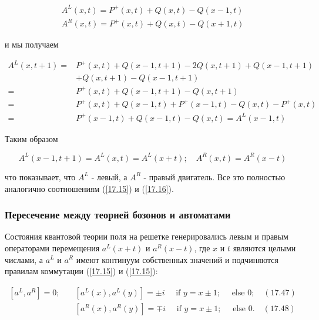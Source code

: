 \documentclass[main.tex]{subfiles}
\begin{document}
\begin{equation}\label{17.}
\begin{array}{l}
{A^{L}(x, t)=P^{+}(x, t)+Q(x, t)-Q(x-1, t)} \\
{A^{R}(x, t)=P^{+}(x, t)+Q(x, t)-Q(x+1, t)}
\end{array}
\end{equation}

и мы получаем

\begin{equation}\label{17.45}
	\begin{aligned} A^{L}(x, t+1)=& P^{+}(x, t)+Q(x-1, t+1)-2 Q(x, t+1)+Q(x-1, t+1) \\ &+Q(x, t+1)-Q(x-1, t+1) \\=& P^{+}(x, t)+Q(x-1, t+1)-Q(x, t+1) \\=& P^{+}(x, t)+Q(x-1, t)+P^{+}(x-1, t)-Q(x, t)-P^{+}(x, t) \\=& P^{+}(x-1, t)+Q(x-1, t)-Q(x, t)=A^{L}(x-1, t) \end{aligned}
\end{equation}

Таким образом

\begin{equation}\label{17.46}
A^{L}(x-1, t+1)=A^{L}(x, t)=A^{L}(x+t) ; \quad A^{R}(x, t)=A^{R}(x-t)
\end{equation}

что показывает, что $A^{L}$ - левый, а $A^{R}$ - правый двигатель. Все это полностью аналогично соотношениям (\ref{17.15}) и (\ref{17.16}).





\subsubsection{Пересечение между теорией бозонов и автоматами}\label{ch17.1.3}

Состояния квантовой теории поля на решетке генерировались левым и правым операторами перемещения $a^{L}(x+t)$ и $a^{R}(x-t)$, где $x$ и $t$ являются целыми числами, а $a^{L}$ и $a^{R}$ имеют континуум собственных значений и подчиняются правилам коммутации (\ref{17.15}) и (\ref{17.15}):

\begin{equation}\label{17.47}
\begin{aligned}
\left[a^{L}, a^{R}\right]=0 ; \quad &\left[a^{L}(x), a^{L}(y)\right]=\pm i \quad \text { if } y=x \pm 1 ; \quad \text { else } 0 ; \quad(17.47) \\
&\left[a^{R}(x), a^{R}(y)\right]=\mp i \quad \text { if } y=x \pm 1 ; \quad \text { else } 0 . \quad(17.48)
\end{aligned}
\end{equation}
\end{document}
